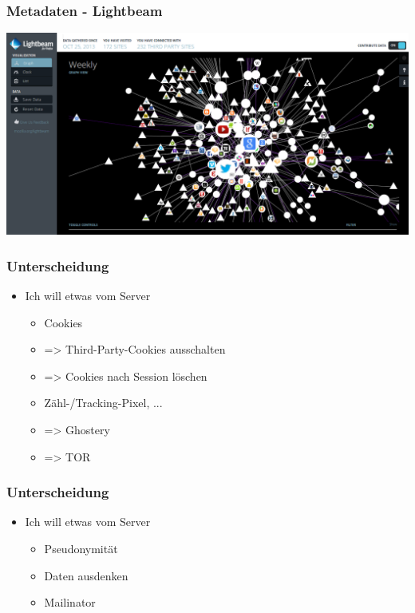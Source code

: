\documentclass[12pt]{beamer}
\begin{document}
\begin{frame}
    \frametitle{Metadaten - Lightbeam}
    \includegraphics[height=0.7\textheight]{img/lightbeam.png}
\end{frame}

\begin{frame}
    \frametitle{Unterscheidung}
    \begin{itemize}
      \item<2-> Ich will etwas vom Server
        \begin{itemize}
          \item<3-> Cookies
          \item<4-> => Third-Party-Cookies ausschalten
          \item<5-> => Cookies nach Session löschen
          \item<6-> Zähl-/Tracking-Pixel, ...
          \item<7-> => Ghostery
          \item<8-> => TOR
        \end{itemize}
    \end{itemize}
\end{frame}

\begin{frame}
    \frametitle{Unterscheidung}
    \begin{itemize}
      \item<2-> Ich will etwas vom Server
        \begin{itemize}
          \item<3-> Pseudonymität
          \item<4-> Daten ausdenken
          \item<5-> Mailinator
        \end{itemize}
    \end{itemize}
\end{frame}
\end{document}
